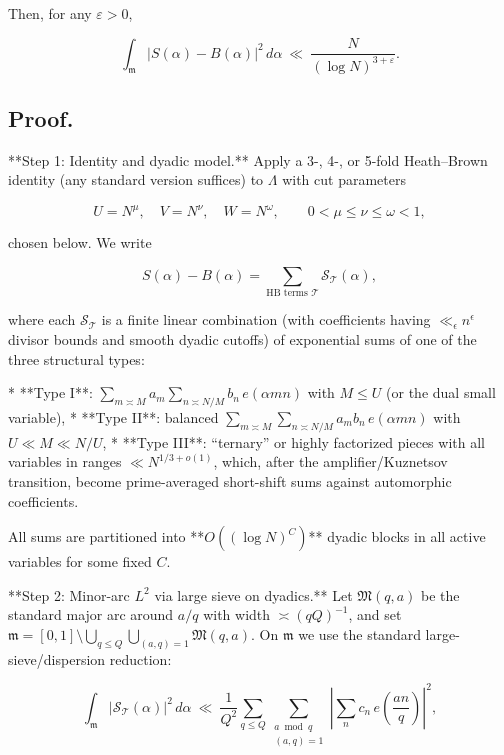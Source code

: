 \documentclass[11pt]{article}
\theoremstyle{definition}
\theoremstyle{remark}
\begin{document}
Then, for any $\varepsilon>0$,

$$
\int_{\mathfrak m}\big|S(\alpha)-B(\alpha)\big|^2\,d\alpha
\ \ll\ \frac{N}{(\log N)^{3+\varepsilon}}.
$$

\subsection*{Proof.}

**Step 1: Identity and dyadic model.**
Apply a 3-, 4-, or 5-fold Heath–Brown identity (any standard version suffices) to $\Lambda$ with cut parameters

$$
U=N^{\mu},\quad V=N^{\nu},\quad W=N^{\omega},\qquad 0<\mu\le\nu\le\omega<1,
$$

chosen below. We write

$$
S(\alpha)-B(\alpha)
=\sum_{\text{HB terms }\mathcal T} \mathcal S_{\mathcal T}(\alpha),
$$

where each $\mathcal S_{\mathcal T}$ is a finite linear combination (with coefficients having $\ll_\epsilon n^\epsilon$ divisor bounds and smooth dyadic cutoffs) of exponential sums of one of the three structural types:

* **Type I**: $\displaystyle \sum_{m\asymp M} a_m \sum_{n\asymp N/M} b_n\,e(\alpha mn)$ with $M\le U$ (or the dual small variable),
* **Type II**: balanced $\displaystyle \sum_{m\asymp M}\sum_{n\asymp N/M} a_m b_n\,e(\alpha mn)$ with $U\ll M\ll N/U$,
* **Type III**: “ternary” or highly factorized pieces with all variables in ranges $ \ll N^{1/3+o(1)}$, which, after the amplifier/Kuznetsov transition, become prime-averaged short-shift sums against automorphic coefficients.

All sums are partitioned into **$O((\log N)^C)$** dyadic blocks in all active variables for some fixed $C$.

**Step 2: Minor-arc $L^2$ via large sieve on dyadics.**
Let $\mathfrak M(q,a)$ be the standard major arc around $a/q$ with width $\asymp (qQ)^{-1}$, and set $\mathfrak m=[0,1]\setminus \bigcup_{q\le Q}\bigcup_{(a,q)=1}\mathfrak M(q,a)$. On $\mathfrak m$ we use the standard large-sieve/dispersion reduction:

\begin{equation}
\int_{\mathfrak m} \big|\mathcal S_{\mathcal T}(\alpha)\big|^2\,d\alpha
\ \ll\ \frac{1}{Q^2}\sum_{q\le Q}\sum_{\substack{a\bmod q\\(a,q)=1}}
\left|\sum_{n} c_n\,e\!\left(\frac{an}{q}\right)\right|^2,
\tag{D.3}
\end{equation}
\end{document}
